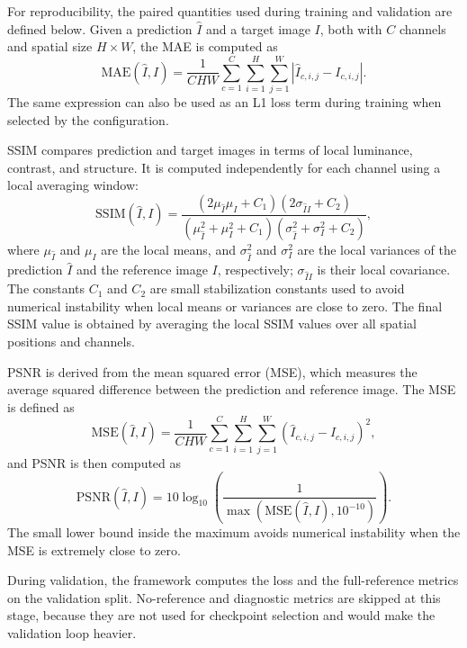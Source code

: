 For reproducibility, the paired quantities used during training and validation are defined below. Given a prediction $\hat{I}$ and a target image $I$, both with $C$ channels and spatial size $H \times W$, the MAE is computed as
\begin{equation}
	\mathrm{MAE}(\hat{I}, I)
	=
	\frac{1}{CHW}
	\sum_{c=1}^{C}
	\sum_{i=1}^{H}
	\sum_{j=1}^{W}
	\left|
	\hat{I}_{c,i,j} - I_{c,i,j}
	\right|.
	\label{eq:mae}
\end{equation}
The same expression can also be used as an L1 loss term during training when selected by the configuration.

SSIM compares prediction and target images in terms of local luminance, contrast, and structure. It is computed independently for each channel using a local averaging window:
\begin{equation}
	\mathrm{SSIM}(\hat{I}, I)
	=
	\frac{
		(2\mu_{\hat{I}}\mu_I + C_1)
		(2\sigma_{\hat{I}I} + C_2)
	}{
		(\mu_{\hat{I}}^2 + \mu_I^2 + C_1)
		(\sigma_{\hat{I}}^2 + \sigma_I^2 + C_2)
	},
	\label{eq:ssim}
\end{equation}
where $\mu_{\hat{I}}$ and $\mu_I$ are the local means, and $\sigma_{\hat{I}}^2$ and $\sigma_I^2$ are the local variances of the prediction $\hat{I}$ and the reference image $I$, respectively; $\sigma_{\hat{I}I}$ is their local covariance. The constants $C_1$ and $C_2$ are small stabilization constants used to avoid numerical instability when local means or variances are close to zero. The final SSIM value is obtained by averaging the local SSIM values over all spatial positions and channels.

PSNR is derived from the mean squared error (MSE), which measures the average squared difference between the prediction and reference image. The MSE is defined as
\begin{equation}
	\mathrm{MSE}(\hat{I}, I)
	=
	\frac{1}{CHW}
	\sum_{c=1}^{C}
	\sum_{i=1}^{H}
	\sum_{j=1}^{W}
	\left(
	\hat{I}_{c,i,j} - I_{c,i,j}
	\right)^2,
	\label{eq:mse}
\end{equation}
and PSNR is then computed as
\begin{equation}
	\mathrm{PSNR}(\hat{I}, I)
	=
	10 \log_{10}
	\left(
	\frac{1}{\max(\mathrm{MSE}(\hat{I}, I), 10^{-10})}
	\right).
	\label{eq:psnr}
\end{equation}
The small lower bound inside the maximum avoids numerical instability when the MSE is extremely close to zero.

During validation, the framework computes the loss and the full-reference metrics on the validation split. No-reference and diagnostic metrics are skipped at this stage, because they are not used for checkpoint selection and would make the validation loop heavier.

